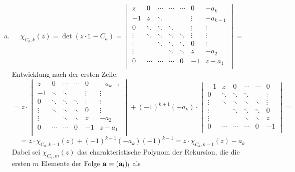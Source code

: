 \begin{enumerate}[(a)]
\item
	\[ \chi_{C_a, k}(z) = \det ( z\cdot \mathds{1} - C_a) = 
		\begin{vmatrix}
			z      & 0      & \cdots & \cdots & \cdots & 0      & -a_k     \\
			-1     & z      & \ddots &        &        & \vdots & -a_{k-1} \\
			0      & \ddots & \ddots & \ddots &        & \vdots & \vdots   \\
			\vdots & \ddots & \ddots & \ddots & \ddots & \vdots & \vdots   \\
			\vdots &        & \ddots & \ddots & \ddots & 0      & \vdots   \\
			\vdots &        &        & \ddots & \ddots & z      & -a_2     \\
			0      & \cdots & \cdots & \cdots & 0      & -1     & z - a_1  \\
		\end{vmatrix} = \]
	Entwicklung nach der ersten Zeile.
	\[ = z \cdot \begin{vmatrix}
			z      & 0      & \cdots & \cdots & 0      & -a_{k-1} \\
			-1     & \ddots & \ddots &        & \vdots & \vdots   \\
			0      & \ddots & \ddots & \ddots & \vdots & \vdots   \\
			\vdots & \ddots & \ddots & \ddots & 0      & \vdots   \\
			\vdots &        & \ddots & \ddots & z      & -a_2     \\
			0      & \cdots & \cdots & 0      & -1     & z - a_1  \\
		\end{vmatrix} + (-1)^{k+1}(-a_k) \cdot
		\begin{vmatrix}
			-1     & z      & 0      & \cdots & \cdots & 0      \\
			0      & \ddots & \ddots & \ddots &        & \vdots \\
			\vdots & \ddots & \ddots & \ddots & \ddots & \vdots \\
			\vdots &        & \ddots & \ddots & \ddots & 0      \\
			\vdots &        &        & \ddots & \ddots & z      \\
			0      & \cdots & \cdots & \cdots & 0      & -1     \\
		\end{vmatrix} = \]
	\[ = z \cdot \chi_{C_a, k-1}(z) + (-1)^{k+1}(-a_k)(-1)^{k-1} = z \cdot \chi_{C_a, k-1}(z) - a_k \]
	Dabei sei $\chi_{C_a, m}(z)$ das charakteristische Polynom der Rekursion, die die ersten $m$ Elemente der Folge ${\bf a} = ({\bf a}_l)_l$ als

\end{enumerate}
